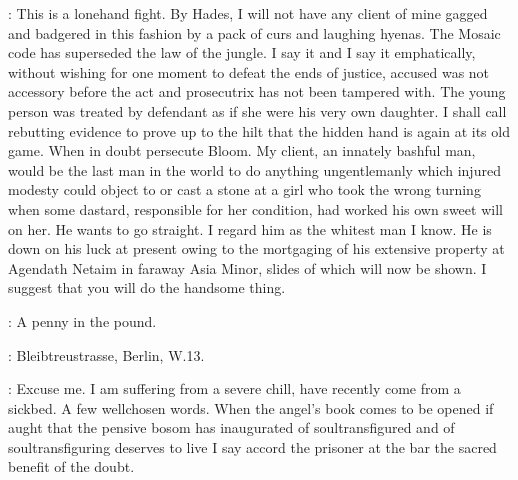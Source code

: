 \JJOM:
 This is a lonehand fight.
By Hades, I will not have any client of mine gagged and badgered
in this fashion by a pack of curs and laughing hyenas.
The Mosaic code has superseded the law of the jungle.
I say it and I say it emphatically,
without wishing for one moment to defeat the ends of justice,
accused was not accessory before the act and prosecutrix has not been tampered with.
The young person was treated by defendant as if she were his very own daughter.
I shall call rebutting evidence to prove up to the hilt
that the hidden hand is again at its old game.
When in doubt persecute Bloom.
My client, an innately bashful man, would be the last man in the world
to do anything ungentlemanly which injured modesty could object to
or cast a stone at a girl who took the wrong turning when some dastard,
responsible for her condition, had worked his own sweet will on her.
He wants to go straight.
I regard him as the whitest man I know.
He is down on his luck at present owing to the mortgaging of his extensive property
at Agendath Netaim in faraway Asia Minor, slides of which will now be shown.
I suggest that you will do the handsome thing.

\Bloom:
A penny in the pound.


\Dlugacz:
Bleibtreustrasse, Berlin, W.13.


\JJOM:
Excuse me.
I am suffering from a severe chill, have recently come from a sickbed.
A few wellchosen words.
When the angel's book comes to be opened
if aught that the pensive bosom has inaugurated of
soultransfigured and of soultransfiguring deserves to live
I say accord the prisoner at the bar the sacred benefit of the doubt.

